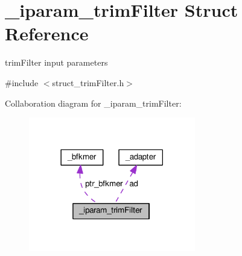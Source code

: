 \hypertarget{struct__iparam__trimFilter}{\section{\+\_\+iparam\+\_\+trim\+Filter Struct Reference}
\label{struct__iparam__trimFilter}
}


trim\+Filter input parameters  




{\ttfamily \#include $<$struct\+\_\+trim\+Filter.\+h$>$}



Collaboration diagram for \+\_\+iparam\+\_\+trim\+Filter\+:\nopagebreak
\begin{figure}[H]
\begin{center}
\leavevmode
\includegraphics[width=206pt]{struct__iparam__trimFilter__coll__graph}
\end{center}
\end{figure}
